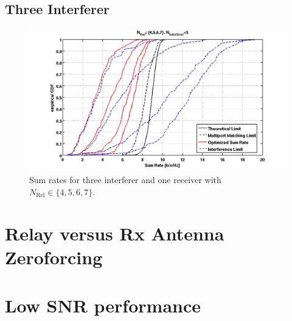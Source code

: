 \subsection{Three Interferer}
\label{sec:3interf}
\begin{figure}[h]
\centering
  \includegraphics[width=0.9\linewidth]{images/Relcomparison_3interferer.png}
\caption{Sum rates for three interferer and one receiver with $N_\text{Rel}\in\{4,5,6,7\}$.}
\label{fig:relcomp_3}
\end{figure}


\section{Relay versus Rx Antenna Zeroforcing}
\label{sec:rel_place}


\section{Low SNR performance}
\label{sec:low_snr}


